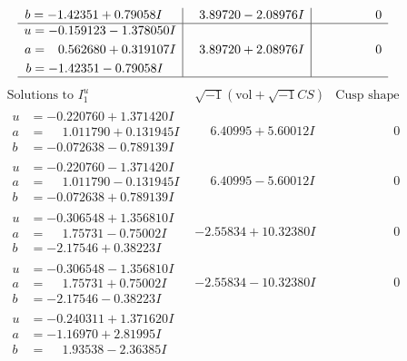 \documentclass[1p]{elsarticle_modified}
\theoremstyle{definition}
\newcommand{\I}{\sqrt{-1}}
\begin{document}
$$\begin{array}{c|c|c}
\begin{aligned}
b &= -1.42351 + 0.79058 I\end{aligned}
 & \phantom{-}3.89720 - 2.08976 I & \phantom{-0.000000 } 0 \\ \hline\begin{aligned}
u &= -0.159123 - 1.378050 I \\
a &= \phantom{-}0.562680 + 0.319107 I \\
b &= -1.42351 - 0.79058 I\end{aligned}
 & \phantom{-}3.89720 + 2.08976 I & \phantom{-0.000000 } 0\\
 \hline 
 \end{array}$$\newpage$$\begin{array}{c|c|c}  
\text{Solutions to }I^u_{1}& \I (\text{vol} + \sqrt{-1}CS) & \text{Cusp shape}\\
 \hline 
\begin{aligned}
u &= -0.220760 + 1.371420 I \\
a &= \phantom{-}1.011790 + 0.131945 I \\
b &= -0.072638 - 0.789139 I\end{aligned}
 & \phantom{-}6.40995 + 5.60012 I & \phantom{-0.000000 } 0 \\ \hline\begin{aligned}
u &= -0.220760 - 1.371420 I \\
a &= \phantom{-}1.011790 - 0.131945 I \\
b &= -0.072638 + 0.789139 I\end{aligned}
 & \phantom{-}6.40995 - 5.60012 I & \phantom{-0.000000 } 0 \\ \hline\begin{aligned}
u &= -0.306548 + 1.356810 I \\
a &= \phantom{-}1.75731 - 0.75002 I \\
b &= -2.17546 + 0.38223 I\end{aligned}
 & -2.55834 + 10.32380 I & \phantom{-0.000000 } 0 \\ \hline\begin{aligned}
u &= -0.306548 - 1.356810 I \\
a &= \phantom{-}1.75731 + 0.75002 I \\
b &= -2.17546 - 0.38223 I\end{aligned}
 & -2.55834 - 10.32380 I & \phantom{-0.000000 } 0 \\ \hline\begin{aligned}
u &= -0.240311 + 1.371620 I \\
a &= -1.16970 + 2.81995 I \\
b &= \phantom{-}1.93538 - 2.36385 I\end{aligned}

\end{array}$$
\end{document}
